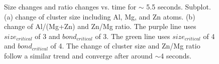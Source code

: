 \begingroup
\begin{figure}[!ht]
  \centering
\caption[Size changes and ratio changes vs. time for $\sim$ 5.5 seconds. ]{Size changes and ratio changes vs. time for $\sim$ 5.5 seconds. Subplot. (a) change of cluster size including Al, Mg, and Zn atoms. (b) change of Al/(Mg+Zn) and Zn/Mg ratio. The purple line uses $size_{critical}$ of 3 and $bond_{critical}$ of 3. The green line uses $size_{critical}$ of 4 and $bond_{critical}$ of 4. The change of cluster size and Zn/Mg ratio follow a similar trend and converge after around $\sim$4 seconds.}
\label{Chap:Al/Vac:fig:Al_Mg_Zn_benchmark}
\end{figure}
\endgroup

